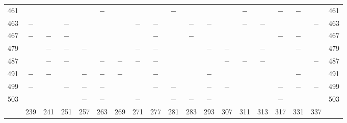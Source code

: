 \begin{center}
\begin{tabular}{r|c|c|c|c|c|c|c|c|c|c|c|c|c|c|c|c|c|r}
461 &  &  &  &  & $-$ &  &  &  & $-$ &  &  &  & $-$ &  & $-$ & $-$ &  & 461\\
463 & $-$ &  & $-$ &  &  &  & $-$ & $-$ &  & $-$ & $-$ &  & $-$ & $-$ &  &  & $-$ & 463\\
467 & $-$ & $-$ & $-$ &  &  &  &  & $-$ &  & $-$ &  &  &  &  & $-$ & $-$ &  & 467\\
479 &  & $-$ & $-$ & $-$ &  &  & $-$ & $-$ &  &  & $-$ & $-$ &  & $-$ &  & $-$ &  & 479\\
487 &  & $-$ & $-$ &  & $-$ & $-$ & $-$ & $-$ &  &  &  & $-$ & $-$ & $-$ &  &  & $-$ & 487\\
491 & $-$ & $-$ &  & $-$ & $-$ & $-$ &  & $-$ &  &  & $-$ &  &  &  &  & $-$ &  & 491\\
499 & $-$ &  & $-$ & $-$ & $-$ &  &  & $-$ & $-$ &  & $-$ & $-$ &  &  & $-$ & $-$ & $-$ & 499\\
503 &  &  &  & $-$ & $-$ &  & $-$ &  & $-$ & $-$ & $-$ &  &  &  & $-$ &  &  & 503\\
\hline
 & 239 & 241 & 251 & 257 & 263 & 269 & 271 & 277 & 281 & 283 & 293 & 307 & 311 & 313 & 317 & 331 & 337 & \\
\hline
\end{tabular}\endgroup\end{center}

